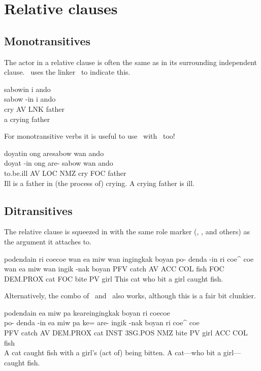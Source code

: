 \section{Relative clauses}
\subsection{Monotransitives}
The actor in a relative clause is often the same as in its surrounding independent clause.
\langname~uses the linker \LNK~to indicate this.
\begin{examples}
	\ex
	\label{ex:father_who_cried}
	\script sabowin i ando \\
	\bits sabow -in i ando \\
	\gloss cry AV LNK father \\
	\tr a crying father
\end{examples}
For monotransitive verbs it is useful to use \LOC~with \NMZ~too!
\begin{examples}
	\ex
	\label{ex:father_at_cried}
	\script doyatin ong aresabow wan ando \\
	\bits doyat -in ong are- sabow wan ando \\
	\gloss to.be.ill AV LOC NMZ cry FOC father \\
	\tr Ill is a father in (the process of) crying.
	\tr A crying father is ill.
\end{examples}

\subsection{Ditransitives}
The relative clause is squeezed in with the same role marker (\FOC, \NOM, and others)
as the argument it attaches to.
\begin{examples}
	\ex
	\label{ex:cat_bit_girl}
	\script podendain ri coecoe wan ea miw wan ingingkak boyan
	\bits po- denda -in ri coe^ coe wan ea miw wan ingik -nak boyan
	\gloss PFV catch AV ACC COL fish FOC DEM.PROX cat FOC bite PV girl
	\tr This cat who bit a girl caught fish.
\end{examples}
Alternatively, the combo of \INST~and \NMZ~also works, although this is a fair bit clunkier.
\begin{examples}
	\ex
	\label{ex:cat_who_bit_girl}
	\script podendain ea miw pa keareingingkak boyan ri coecoe \\
	\bits po- denda -in ea miw pa ke= are- ingik -nak boyan ri coe^ coe \\
	\gloss PFV catch AV DEM.PROX cat INST 3SG.POS NMZ bite PV girl ACC COL fish \\
	\tr A cat caught fish with a girl's (act of) being bitten.
	\tr A cat---who bit a girl---caught fish.
\end{examples}

